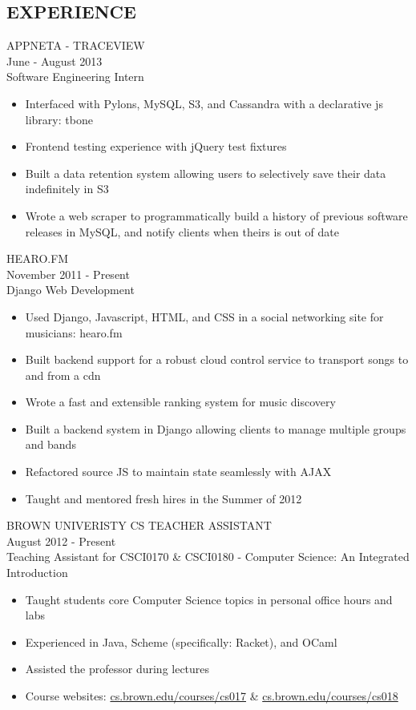 \documentclass[11pt]{res} %
\begin{document}
\begin{resume}
\section{EXPERIENCE}
APPNETA - TRACEVIEW \\
June - August 2013\\
Software Engineering Intern
\vspace{0.02in}
   \begin{itemize} \itemsep -2pt
   \item Interfaced with Pylons, MySQL, S3, and Cassandra with a declarative js library: tbone
   \item Frontend testing experience with jQuery test fixtures
   \item Built a data retention system allowing users to selectively save their data indefinitely in S3
   \item Wrote a web scraper to programmatically build a history of previous software releases in MySQL, and notify clients when theirs is out of date
   \end{itemize}
HEARO.FM \\
November 2011 - Present \\
Django Web Development
\vspace{0.02in}
   \begin{itemize} \itemsep -2pt
   \item Used Django, Javascript, HTML, and CSS in a social networking site for musicians: hearo.fm
   \item Built backend support for a robust cloud control service to transport songs to and from a cdn
   \item Wrote a fast and extensible ranking system for music discovery
   \item Built a backend system in Django allowing clients to manage multiple groups and bands
   \item Refactored source JS to maintain state seamlessly with AJAX
   \item Taught and mentored fresh hires in the Summer of 2012
   \end{itemize}

BROWN UNIVERISTY CS TEACHER ASSISTANT \\
August 2012 - Present \\
Teaching Assistant for CSCI0170 \& CSCI0180 - Computer Science: An Integrated Introduction
\vspace{0.02in}
   \begin{itemize} \itemsep -2pt
   \item Taught students core Computer Science topics in personal office hours and labs
   \item Experienced in Java, Scheme (specifically: Racket), and OCaml
   \item Assisted the professor during lectures
   \item Course websites:
      \href{http://cs.brown.edu/courses/cs017}{cs.brown.edu/courses/cs017} \&
      \href{http://cs.brown.edu/courses/cs018}{cs.brown.edu/courses/cs018}


\end{itemize}
\end{resume}
\end{document}
